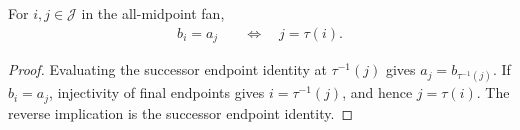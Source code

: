 \begin{lemma}
    \label{thm:area_law_cell_fan_successor_iff}
    \leanok
    For $i,j\in\mathcal J$ in the all-midpoint fan,
    \begin{align}
        b_i=a_j & \quad\Longleftrightarrow\quad j=\tau(i).
    \end{align}
\end{lemma}
\begin{proof}\leanok
    Evaluating the successor endpoint identity at $\tau^{-1}(j)$ gives
    $a_j=b_{\tau^{-1}(j)}$. If $b_i=a_j$, injectivity of final
    endpoints gives $i=\tau^{-1}(j)$, and hence $j=\tau(i)$.
    The reverse implication is the successor endpoint identity.
\end{proof}
